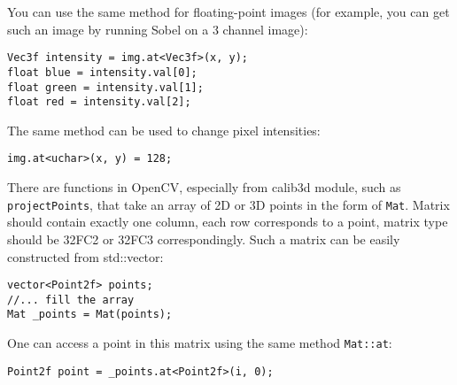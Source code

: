 You can use the same method for floating-point images (for example, you can get such an image by running Sobel on a 3 channel image):
\begin{lstlisting}
Vec3f intensity = img.at<Vec3f>(x, y);
float blue = intensity.val[0];
float green = intensity.val[1];
float red = intensity.val[2];
\end{lstlisting}

The same method can be used to change pixel intensities:
\begin{lstlisting}
img.at<uchar>(x, y) = 128;
\end{lstlisting}

There are functions in OpenCV, especially from calib3d module, such as \texttt{projectPoints}, that take an array of 2D or 3D points in the form of \texttt{Mat}. Matrix should contain exactly one column, each row corresponds to a point, matrix type should be 32FC2 or 32FC3 correspondingly. Such a matrix can be easily constructed from std::vector:
\begin{lstlisting}
vector<Point2f> points;
//... fill the array
Mat _points = Mat(points);
\end{lstlisting}
One can access a point in this matrix using the same method \texttt{Mat::at}:
\begin{lstlisting}
Point2f point = _points.at<Point2f>(i, 0);
\end{lstlisting}


\fi



